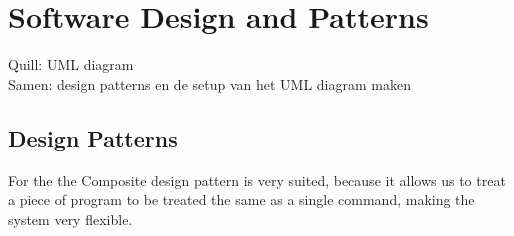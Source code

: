 \chapter{Software Design and Patterns}
Quill: UML diagram\\
Samen: design patterns en de setup van het UML diagram maken


\section{Design Patterns}
For the  the Composite design pattern is very suited, because it allows us to treat a piece of program to be treated the same as a single command, making the system very flexible. 
